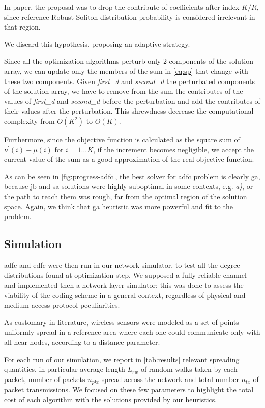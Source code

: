 \documentclass[12pt,journal,draftclsnofoot,onecolumn]{IEEEtran}
\makeatletter
\let\origsubsubsection\subsubsection
\renewcommand\subsubsection{\@ifstar{\starsubsubsection}{\nostarsubsubsection}}
\newcommand\nostarsubsubsection[1]
{\subsubsectionprelude\origsubsubsection{#1}}
\newcommand\subsubsectionprelude{%
  \vspace{6pt}
}
\makeatother
\begin{document}
In paper\cite{Lin2007}, the proposal was to drop the contribute of coefficients after index $K/R$, since reference Robust Soliton distribution probability is considered irrelevant in that region.

We discard this hypothesis, proposing an adaptive strategy.

Since all the optimization algorithms perturb only 2 components of the solution array, we can update only the members of the sum in \autoref{eq:sp} that change with these two components.
Given \textit{first\_d} and \textit{second\_d} the perturbated components of the solution array, we have to remove from the sum the contributes of the values of \textit{first\_d} and \textit{second\_d} before the perturbation and add the contributes of their values after the perturbation.
This shrewdness decrease the computational complexity from $O(K^2)$ to $O(K)$.

Furthermore, since the objective function is calculated as the square sum of $\nu^\prime(i) - \mu(i)$ for $i=1 \dots K$, if the increment becomes negligible, we accept the current value of the sum as a good approximation of the real objective function.

As can be seen in \autoref{fig:progress-adfc}, the best solver for \gls{adfc} problem is clearly \gls{ga}, because \gls{jb} and \gls{sa} solutions were highly suboptimal in some contexts, e.g. \emph{a)}, or the path to reach them was rough, far from the optimal region of the solution space.
Again, we think that \gls{ga} heuristic was more powerful and fit to the problem.

\subsection{Simulation}
\gls{adfc} and \gls{edfc} were then run in our network simulator, to test all the degree distributions found at optimization step.
We supposed a fully reliable channel and implemented then a network layer simulator: this was done to assess the viability of the coding scheme in a general context, regardless of physical and medium access protocol peculiarities.

As customary in literature, wireless sensors were modeled as a set of points uniformly spread in a reference area where each one could communicate only with all near nodes, according to a distance parameter.

\subsubsection{Transmission cost}
For each run of our simulation, we report in \autoref{tab:results} relevant spreading quantities, in particular average length $L_{rw}$ of random walks taken by each packet, number of packets $n_{pkt}$ spread across the network and total number $n_{tx}$ of packet transmissions.
We focused on these few parameters to highlight the total cost of each algorithm with the solutions provided by our heuristics.
\end{document}
